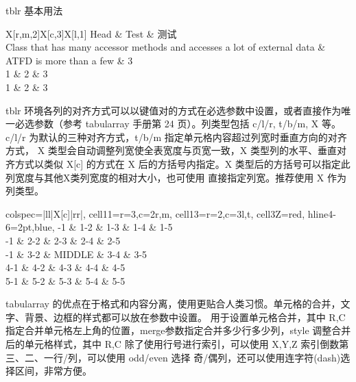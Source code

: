 \begin{texcode}[]{}
    \begin{table}[H]
        \caption{tblr 基本用法}
        \label{tbl:2-1}
        \begin{tblr}{
            X[r,m,2]X[c,3]X[l,1]
        }
            \toprule
            Head & Test & 测试 \\
            \midrule
            Class that has many accessor methods and accesses a lot of external data & ATFD is more than a few & 3 \\
            1 & 2 & 3 \\
            1 & 2 & 3 \\
            \bottomrule
        \end{tblr}
    \end{table}
\end{texcode}

tblr 环境各列的对齐方式可以以键值对的方式在必选参数中设置，或者直接作为唯一必选参数（参考 tabularray 手册第 24 页）。列类型包括 c/l/r, t/b/m, X 等。c/l/r 为默认的三种对齐方式，t/b/m 指定单元格内容超过列宽时垂直方向的对齐方式， X 类型会自动调整列宽使全表宽度与页宽一致，X 类型列的水平、垂直对齐方式以类似 X[c] 的方式在 X 后的方括号内指定。X 类型后的方括号可以指定此列宽度与其他X类列宽度的相对大小，也可使用 直接指定列宽。推荐使用 X 作为列类型。

\begin{texcode}[]{}
    \begin{tblr}{
        colspec={|ll|X[c]|rr|},
        cell{1}{1}={r=3,c=2}{r,m},
        cell{1}{3}={r=2,c=3}{l,t},
        cell{3}{Z}={}{red},
        hline{4-6}={2pt,blue},
    }
        -1 & 1-2 & 1-3 & 1-4 & 1-5 \\
        -1 & 2-2 & 2-3 & 2-4 & 2-5 \\
        -1 & 3-2 & MIDDLE & 3-4 & 3-5 \\
        4-1 & 4-2 & 4-3 & 4-4 & 4-5 \\
        5-1 & 5-2 & 5-3 & 5-4 & 5-5 \\
    \end{tblr}
\end{texcode}

tabularray 的优点在于格式和内容分离，使用更贴合人类习惯。单元格的合并，文字、背景、边框的样式都可以放在参数中设置。 用于设置单元格合并，其中 R,C 指定合并单元格左上角的位置，merge参数指定合并多少行多少列，style 调整合并后的单元格样式，其中 R,C 除了使用行号进行索引，可以使用 X,Y,Z 索引倒数第三、二、一行/列，可以使用 odd/even 选择 奇/偶列，还可以使用连字符(dash)选择区间，非常方便。

